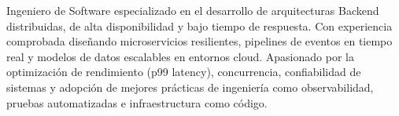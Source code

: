 %
%
%
%
%


\noindent
{\cvBodyStyle\textcolor{cvSecondary}{%
Ingeniero de Software especializado en el desarrollo de arquitecturas Backend distribuidas, de alta disponibilidad y bajo tiempo de respuesta. Con experiencia comprobada diseñando microservicios resilientes, pipelines de eventos en tiempo real y modelos de datos escalables en entornos cloud. Apasionado por la optimización de rendimiento (p99 latency), concurrencia, confiabilidad de sistemas y adopción de mejores prácticas de ingeniería como observabilidad, pruebas automatizadas e infraestructura como código.
}}\par

